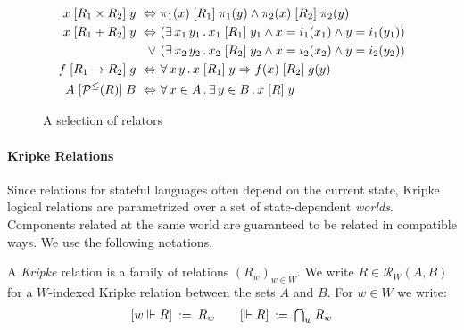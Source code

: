 \begin{figure} %
  \figsize
  \begin{align*}
    x \mathrel{[{R_1 \times R_2}]} y \ \Leftrightarrow\  &
      \pi_1(x) \mathrel{[{R_1}]} \pi_1(y) \wedge
      \pi_2(x) \mathrel{[{R_2}]} \pi_2(y) \\
    x \mathrel{[{R_1 + R_2}]} y \ \Leftrightarrow\  &
      (\exists \, x_1 \, y_1 \,.\,
        x_1 \mathrel{[{R_1}]} y_1 \wedge
        x = i_1(x_1) \wedge
        y = i_1(y_1)) \\ \vee\ &
      (\exists \, x_2 \, y_2 \,.\,
        x_2 \mathrel{[{R_2}]} y_2 \wedge
        x = i_2(x_2) \wedge
        y = i_2(y_2)) \\
    f \mathrel{[{R_1 \rightarrow R_2}]} g \ \Leftrightarrow\  &
      \forall \, x \, y \,.\,
        x \mathrel{[{R_1}]} y \Rightarrow
        f(x) \mathrel{[{R_2}]} g(y) \\
    A \mathrel{[{\mathcal{P}^\le(R)}]} B \ \Leftrightarrow\  &
      \forall \, x \in A \,.\,
      \exists \, y \in B \,.\,
      x \mathrel{[{R}]} y
  \end{align*}
  \caption{A selection of relators}
  \label{fig:relators}
\end{figure}


\paragraph{Kripke Relations} %

Since relations for stateful languages
often depend on the current state,
Kripke logical relations
are parametrized over a set of state-dependent \emph{worlds}.
Components related at the same world
are guaranteed to be related in compatible ways.
We use the following notations.

\begin{definition} \label{def:klr} %
A \emph{Kripke} relation is
a family of relations $(R_w)_{w \in W}$.
We write $R \in \mathcal{R}_W(A, B)$
for a $W$-indexed Kripke relation between the sets $A$ and $B$.
For $w \in W$ we write:
\[
\begin{array}{c@{\qquad}c}
    [w \Vdash R] \: := \: R_w &
    [\Vdash R] \: := \: \bigcap_{w} R_w
\end{array}
\]
\end{definition}

